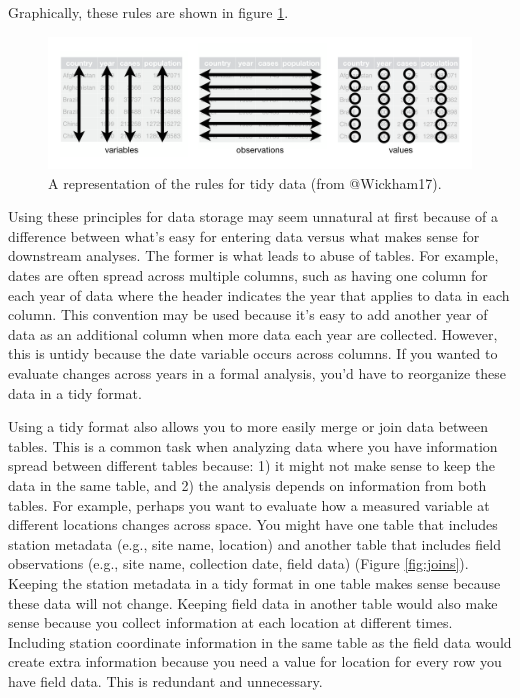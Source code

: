 \documentclass[
]{book}
\begin{document}
Graphically, these rules are shown in figure \ref{fig:tidy}.

\begin{figure}

{\centering \includegraphics[width=1\linewidth]{img/tidy-1} 

}

\caption{A representation of the rules for tidy data (from @Wickham17).}\label{fig:tidy}
\end{figure}

Using these principles for data storage may seem unnatural at first because of a difference between what's easy for entering data versus what makes sense for downstream analyses. The former is what leads to abuse of tables. For example, dates are often spread across multiple columns, such as having one column for each year of data where the header indicates the year that applies to data in each column. This convention may be used because it's easy to add another year of data as an additional column when more data each year are collected. However, this is untidy because the date variable occurs across columns. If you wanted to evaluate changes across years in a formal analysis, you'd have to reorganize these data in a tidy format.

Using a tidy format also allows you to more easily merge or join data between tables. This is a common task when analyzing data where you have information spread between different tables because: 1) it might not make sense to keep the data in the same table, and 2) the analysis depends on information from both tables. For example, perhaps you want to evaluate how a measured variable at different locations changes across space. You might have one table that includes station metadata (e.g., site name, location) and another table that includes field observations (e.g., site name, collection date, field data) (Figure \ref{fig:joins}). Keeping the station metadata in a tidy format in one table makes sense because these data will not change. Keeping field data in another table would also make sense because you collect information at each location at different times. Including station coordinate information in the same table as the field data would create extra information because you need a value for location for every row you have field data. This is redundant and unnecessary.
\end{document}
